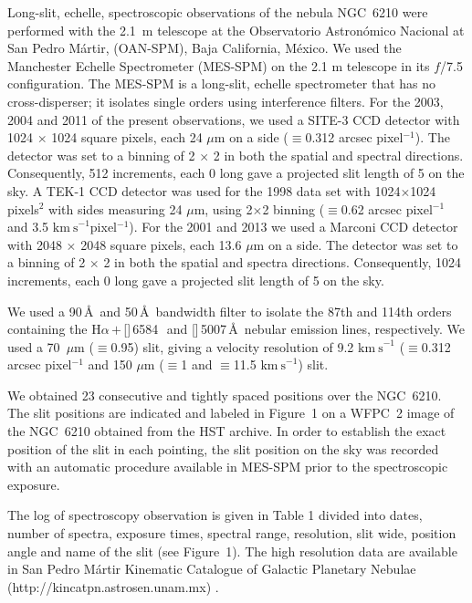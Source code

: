 \documentclass{aa}
\makeatletter
\newcommand{\kms}{\ensuremath{\mathrm{km\ s}^{-1}}}
\newcommand\NIIlam{[\ion{N}{2}]\,6584\,}
\newcommand\OIIIlam{[\ion{O}{3}]\,5007\,\AA\@}
\newcommand\Ha{\ensuremath{\mathrm{H}\alpha}}
\makeatother
\begin{document}
Long-slit, echelle, spectroscopic observations of the nebula NGC~6210
were performed with the 2.1~m telescope at the Observatorio
Astron\'omico Nacional at San Pedro M\'artir, (OAN-SPM), Baja
California, M\'exico. We used the Manchester Echelle Spectrometer
(MES-SPM) \citep{Meaburn03} on the 2.1 m telescope in its $f$/7.5
configuration.  The MES-SPM is a long-slit, echelle spectrometer that
has no cross-disperser; it isolates single orders using interference
filters. For the 2003, 2004 and 2011 of the present observations, we used a
SITE-3 CCD detector with 1024 $\times$ 1024 square pixels, each 24
$\mu$m on a side ($\equiv$0.312 arcsec pixel$^{-1}$). The detector
was set to a binning of 2 $\times$ 2 in both the spatial and spectral
directions. Consequently, 512 increments, each 0 long gave
a projected slit length of 5 on the sky. A TEK-1 CCD detector
was used for the 1998 data set with 1024$\times$1024 pixels$^2$ with
sides measuring 24 $\mu$m, using 2$\times$2 binning ($\equiv$0.62 arcsec
pixel$^{-1}$ and 3.5 \kms pixel$^{-1}$). For the 2001 and 2013 we used
a Marconi CCD detector with 2048 $\times$ 2048 square pixels, each 13.6
$\mu$m on a side. The detector was set to a binning of 2 $\times$ 2 in
both the spatial and spectra directions. Consequently, 1024
increments, each 0 long gave a projected slit length of
5 on the sky.

We used a 90\,\AA\, and 50\,\AA\, bandwidth
filter to isolate the 87th and 114th orders containing the
\Ha\,$+$\,\NIIlam\, and \OIIIlam\, nebular emission lines,
respectively. We used a 70~$\mu$m{} ($\equiv$0.95\arcsec) slit, giving
a velocity resolution of 9.2 \kms{} ($\equiv$0.312 arcsec
pixel$^{-1}$ and 150 $\mu$m{} ($\equiv$1 and $\equiv$11.5
\kms) slit.


We obtained 23 consecutive and tightly spaced positions over the
NGC~6210. The slit positions are indicated and labeled in Figure~1 on
a WFPC~2 image of the NGC~6210 obtained from the HST archive. In order
to establish the exact position of the slit in each pointing, the slit
position on the sky was recorded with an automatic procedure available
in MES-SPM prior to the spectroscopic exposure.

The log of spectroscopy observation is given in Table 1 divided into
dates, number of spectra, exposure times, spectral range, resolution,
slit wide, position angle and name of the slit (see Figure~1). 
The high resolution data are available in San Pedro M\'artir Kinematic Catalogue
of Galactic Planetary Nebulae (http://kincatpn.astrosen.unam.mx)
\citep{Lopez12}.
\end{document}
